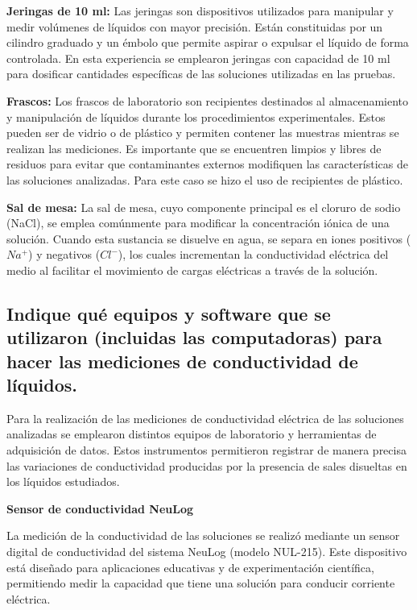 \documentclass[a4paper,openany,12pt]{book}
\begin{document}
\textbf{Jeringas de 10 ml:}  
Las jeringas son dispositivos utilizados para manipular y medir volúmenes de
líquidos con mayor precisión. Están constituidas por un cilindro graduado y un
émbolo que permite aspirar o expulsar el líquido de forma controlada. En esta
experiencia se emplearon jeringas con capacidad de 10 ml para dosificar
cantidades específicas de las soluciones utilizadas en las pruebas.

\textbf{Frascos:}  
Los frascos de laboratorio son recipientes destinados al almacenamiento y
manipulación de líquidos durante los procedimientos experimentales. Estos
pueden ser de vidrio o de plástico y permiten contener las muestras mientras
se realizan las mediciones. Es importante que se encuentren limpios y libres
de residuos para evitar que contaminantes externos modifiquen las
características de las soluciones analizadas.
Para este caso se hizo el uso de recipientes de plástico.

\textbf{Sal de mesa:}  
La sal de mesa, cuyo componente principal es el cloruro de sodio (NaCl), se
emplea comúnmente para modificar la concentración iónica de una solución.
Cuando esta sustancia se disuelve en agua, se separa en iones positivos
($Na^+$) y negativos ($Cl^-$), los cuales incrementan la conductividad
eléctrica del medio al facilitar el movimiento de cargas eléctricas a través
de la solución.



\subsection{Indique qué equipos y software que se utilizaron (incluidas las computadoras) para hacer las
	mediciones de conductividad de líquidos.}



Para la realización de las mediciones de conductividad eléctrica de las
soluciones analizadas se emplearon distintos equipos de laboratorio y
herramientas de adquisición de datos. Estos instrumentos permitieron
registrar de manera precisa las variaciones de conductividad producidas
por la presencia de sales disueltas en los líquidos estudiados.

\textbf{Sensor de conductividad NeuLog}

La medición de la conductividad de las soluciones se realizó mediante
un sensor digital de conductividad del sistema NeuLog (modelo NUL-215).
Este dispositivo está diseñado para aplicaciones educativas y de
experimentación científica, permitiendo medir la capacidad que tiene
una solución para conducir corriente eléctrica.
\end{document}
